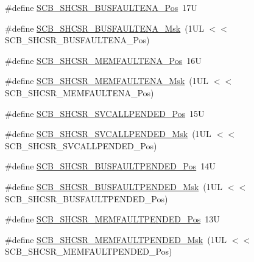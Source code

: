 \begin{DoxyCompactItemize}
\item 
\#define \hyperlink{group___c_m_s_i_s___s_c_b_ga3d32edbe4a5c0335f808cfc19ec7e844}{S\+C\+B\+\_\+\+S\+H\+C\+S\+R\+\_\+\+B\+U\+S\+F\+A\+U\+L\+T\+E\+N\+A\+\_\+\+Pos}~17U
\item 
\#define \hyperlink{group___c_m_s_i_s___s_c_b_ga43e8cbe619c9980e0d1aacc85d9b9e47}{S\+C\+B\+\_\+\+S\+H\+C\+S\+R\+\_\+\+B\+U\+S\+F\+A\+U\+L\+T\+E\+N\+A\+\_\+\+Msk}~(1\+U\+L $<$$<$ S\+C\+B\+\_\+\+S\+H\+C\+S\+R\+\_\+\+B\+U\+S\+F\+A\+U\+L\+T\+E\+N\+A\+\_\+\+Pos)
\item 
\#define \hyperlink{group___c_m_s_i_s___s_c_b_ga685b4564a8760b4506f14ec4307b7251}{S\+C\+B\+\_\+\+S\+H\+C\+S\+R\+\_\+\+M\+E\+M\+F\+A\+U\+L\+T\+E\+N\+A\+\_\+\+Pos}~16U
\item 
\#define \hyperlink{group___c_m_s_i_s___s_c_b_gaf084424fa1f69bea36a1c44899d83d17}{S\+C\+B\+\_\+\+S\+H\+C\+S\+R\+\_\+\+M\+E\+M\+F\+A\+U\+L\+T\+E\+N\+A\+\_\+\+Msk}~(1\+U\+L $<$$<$ S\+C\+B\+\_\+\+S\+H\+C\+S\+R\+\_\+\+M\+E\+M\+F\+A\+U\+L\+T\+E\+N\+A\+\_\+\+Pos)
\item 
\#define \hyperlink{group___c_m_s_i_s___s_c_b_ga2f93ec9b243f94cdd3e94b8f0bf43641}{S\+C\+B\+\_\+\+S\+H\+C\+S\+R\+\_\+\+S\+V\+C\+A\+L\+L\+P\+E\+N\+D\+E\+D\+\_\+\+Pos}~15U
\item 
\#define \hyperlink{group___c_m_s_i_s___s_c_b_ga6095a7acfbad66f52822b1392be88652}{S\+C\+B\+\_\+\+S\+H\+C\+S\+R\+\_\+\+S\+V\+C\+A\+L\+L\+P\+E\+N\+D\+E\+D\+\_\+\+Msk}~(1\+U\+L $<$$<$ S\+C\+B\+\_\+\+S\+H\+C\+S\+R\+\_\+\+S\+V\+C\+A\+L\+L\+P\+E\+N\+D\+E\+D\+\_\+\+Pos)
\item 
\#define \hyperlink{group___c_m_s_i_s___s_c_b_gaa22551e24a72b65f1e817f7ab462203b}{S\+C\+B\+\_\+\+S\+H\+C\+S\+R\+\_\+\+B\+U\+S\+F\+A\+U\+L\+T\+P\+E\+N\+D\+E\+D\+\_\+\+Pos}~14U
\item 
\#define \hyperlink{group___c_m_s_i_s___s_c_b_ga677c23749c4d348f30fb471d1223e783}{S\+C\+B\+\_\+\+S\+H\+C\+S\+R\+\_\+\+B\+U\+S\+F\+A\+U\+L\+T\+P\+E\+N\+D\+E\+D\+\_\+\+Msk}~(1\+U\+L $<$$<$ S\+C\+B\+\_\+\+S\+H\+C\+S\+R\+\_\+\+B\+U\+S\+F\+A\+U\+L\+T\+P\+E\+N\+D\+E\+D\+\_\+\+Pos)
\item 
\#define \hyperlink{group___c_m_s_i_s___s_c_b_gaceb60fe2d8a8cb17fcd1c1f6b5aa924f}{S\+C\+B\+\_\+\+S\+H\+C\+S\+R\+\_\+\+M\+E\+M\+F\+A\+U\+L\+T\+P\+E\+N\+D\+E\+D\+\_\+\+Pos}~13U
\item 
\#define \hyperlink{group___c_m_s_i_s___s_c_b_ga9abc6c2e395f9e5af4ce05fc420fb04c}{S\+C\+B\+\_\+\+S\+H\+C\+S\+R\+\_\+\+M\+E\+M\+F\+A\+U\+L\+T\+P\+E\+N\+D\+E\+D\+\_\+\+Msk}~(1\+U\+L $<$$<$ S\+C\+B\+\_\+\+S\+H\+C\+S\+R\+\_\+\+M\+E\+M\+F\+A\+U\+L\+T\+P\+E\+N\+D\+E\+D\+\_\+\+Pos)
$$
\end{DoxyCompactItemize}

